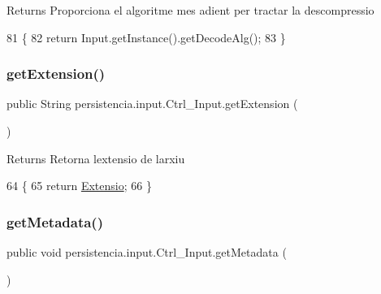 \begin{DoxyReturn}{Returns}
Proporciona el algoritme mes adient per tractar la descompressio 
\end{DoxyReturn}

\begin{DoxyCode}
81     \{
82         \textcolor{keywordflow}{return} Input.getInstance().getDecodeAlg();
83     \}
\end{DoxyCode}
\mbox{\label{classpersistencia_1_1input_1_1Ctrl__Input_a46d569c2f3ceb0ab6cf9900708b3316a}} 
\subsubsection{\texorpdfstring{get\+Extension()}{getExtension()}}
{\footnotesize\ttfamily public String persistencia.\+input.\+Ctrl\+\_\+\+Input.\+get\+Extension (\begin{DoxyParamCaption}{ }\end{DoxyParamCaption})\hspace{0.3cm}{\ttfamily [inline]}}

\begin{DoxyReturn}{Returns}
Retorna l\textquotesingle{}extensio de l\textquotesingle{}arxiu 
\end{DoxyReturn}

\begin{DoxyCode}
64                                  \{
65         \textcolor{keywordflow}{return} \hyperlink{classpersistencia_1_1input_1_1Ctrl__Input_a6041b56aa31f01f75d02382f98e259e5}{Extensio};
66     \}
\end{DoxyCode}
\mbox{\label{classpersistencia_1_1input_1_1Ctrl__Input_a46e05fce164a6803820c02565c1769c8}} 
\subsubsection{\texorpdfstring{get\+Metadata()}{getMetadata()}}
{\footnotesize\ttfamily public void persistencia.\+input.\+Ctrl\+\_\+\+Input.\+get\+Metadata (\begin{DoxyParamCaption}{ }\end{DoxyParamCaption})\hspace{0.3cm}{\ttfamily [inline]}}



